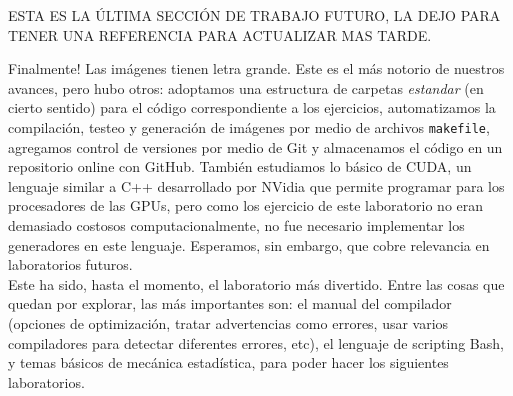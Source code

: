 \documentclass[a4paper,12pt]{article}
\begin{document}
ESTA ES LA ÚLTIMA SECCIÓN DE TRABAJO FUTURO, LA DEJO PARA TENER UNA REFERENCIA PARA ACTUALIZAR MAS TARDE.

Finalmente! Las imágenes tienen letra grande. Este es el más notorio de nuestros avances, pero hubo otros: adoptamos una estructura de carpetas {\it estandar} (en cierto sentido) para el código correspondiente a los ejercicios, automatizamos la compilación, testeo y generación de imágenes por medio de archivos \verb|makefile|, agregamos control de versiones por medio de Git y almacenamos el código en un repositorio online con GitHub. También estudiamos lo básico de CUDA, un lenguaje similar a C++ desarrollado por NVidia que permite programar para los procesadores de las GPUs, pero como los ejercicio de este laboratorio no eran demasiado costosos computacionalmente, no fue necesario implementar los generadores en este lenguaje. Esperamos, sin embargo, que cobre relevancia en laboratorios futuros.\\

Este ha sido, hasta el momento, el laboratorio más divertido. Entre las cosas que quedan por explorar, las más importantes son: el manual del compilador (opciones de optimización, tratar advertencias como errores, usar varios compiladores para detectar diferentes errores, etc), el lenguaje de scripting Bash, y temas básicos de mecánica estadística, para poder hacer los siguientes laboratorios.

%



\end{document}
